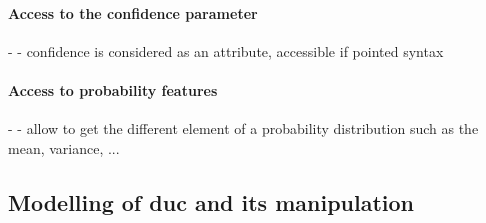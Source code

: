 \paragraph{Access to the confidence parameter}
- \cite{DBLP:conf/models/BurguenoBMV18, DBLP:conf/sle/MayerhoferWV16, DBLP:conf/quatic/VallecilloMO16}
	- confidence is considered as an attribute, accessible if pointed syntax
	
\paragraph{Access to probability features}
- \cite{baudin2017openturns, DBLP:journals/corr/BorgstromGGMG13, DBLP:conf/ecmdafa/BertoaMBBTV18, DBLP:conf/asplos/BornholtMM14, osti_1430202, DBLP:journals/peerj-cs/SalvatierWF16}
	- allow to get the different element of a probability distribution such as the mean, variance, ...




\subsection[Modelling of data uncertainty and its manipulation]{Modelling of \gls{duc} and its manipulation}